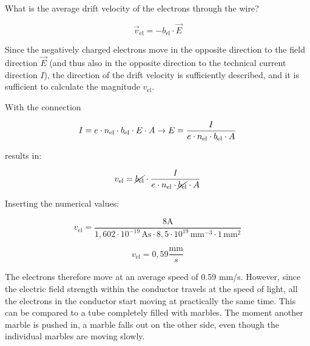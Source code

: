 {\begin{expl}{}{}
	

	What is the average drift velocity of the electrons through the wire?

	\begin{equation*}
		\vec{v}_\mathrm{el} = - b_\mathrm{el} \cdot \vec{E}
	\end{equation*}

	Since the negatively charged electrons move in the opposite direction to the field direction $\vec{E}$ (and thus also in the opposite direction to the
    technical current direction $I$), the direction of the drift velocity is sufficiently described,
    and it is sufficient to calculate the magnitude $v_\mathrm{el}$.


	With the connection

	\begin{equation*}
	 I = e \cdot n_\mathrm{el} \cdot b_\mathrm{el} \cdot E  \cdot A\\
\rightarrow E = \frac{I}{e \cdot n_\mathrm{el} \cdot b_\mathrm{el} \cdot A}
	\end{equation*}

	

	results in:

\begin{equation*}
	v_\mathrm{el} = \cancel{b_\mathrm{el}} \cdot \frac{I}{e \cdot n_\mathrm{el} \cdot \cancel{b_\mathrm{el}} \cdot A}
\end{equation*}	

Inserting the numerical values:

\begin{equation*}
	v_\mathrm{el} = \frac{8 \mathrm{A}}{1,602 \cdot 10^{-19} \, \mathrm{As} \cdot 8,5 \cdot 10^{19} \, \mathrm{mm}^{-3} \cdot 1 \, \mathrm{mm}^2 }
\end{equation*}	


\begin{equation*}
	v_\mathrm{el} = 0,59 \frac{\mathrm{mm}}{s} 
\end{equation*}	

The electrons therefore move at an average speed of 0.59 mm/s. However, since the electric field strength within the conductor
travels at the speed of light, all the electrons in the conductor start moving at practically the same time.
This can be compared to a tube completely filled with marbles. The moment another marble is pushed in, 
a marble falls out on the other side, even though the individual marbles are moving slowly.



\end{expl}

}


